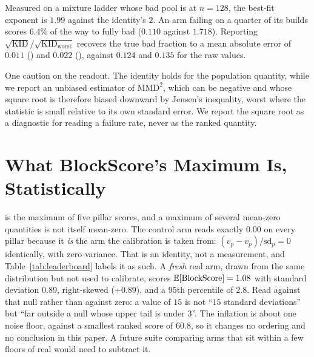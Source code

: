 Measured on a mixture ladder whose bad pool is \randomvox{} at $n{=}128$, the best-fit
exponent is $\mathbf{1.99}$ against the identity's $2$. An arm failing on a quarter of
its builds scores $6.4\%$ of the way to fully bad ($0.110$ against $1.718$). Reporting
$\sqrt{\mathrm{KID}}/\sqrt{\mathrm{KID}_{\text{worst}}}$ recovers the true bad fraction
to a mean absolute error of $\mathbf{0.011}$ (\mvkid{}) and $\mathbf{0.022}$ (\vkid{}),
against $0.124$ and $0.135$ for the raw values.

One caution on the readout. The identity holds for the population quantity, while we
report an unbiased estimator of $\mathrm{MMD}^2$, which can be negative and whose square
root is therefore biased downward by Jensen's inequality, worst where the statistic is
small relative to its own standard error. We report the square root as a diagnostic for
reading a failure rate, never as the ranked quantity.

\section{What BlockScore's Maximum Is, Statistically}
\label{app:blockscore}

\blockscore{} is the maximum of five pillar scores, and a maximum of several
mean-zero quantities is not itself mean-zero. The control arm reads exactly
$0.00$ on every pillar because it \emph{is} the arm the calibration is taken
from: $(v_p - v_p)/\mathrm{sd}_p = 0$ identically, with zero variance. That is
an identity, not a measurement, and Table~\ref{tab:leaderboard} labels it as
such. A \emph{fresh} real arm, drawn from the same distribution but not used to
calibrate, scores $\mathbb{E}[\mbox{BlockScore}] = 1.08$ with standard deviation
$0.89$, right-skewed ($+0.89$), and a $95$th percentile of $2.8$. Read
\blockscore{} against that null rather than against zero: a value of $15$ is not
``$15$ standard deviations'' but ``far outside a null whose upper tail is under
$3$''. The inflation is about one noise floor, against a smallest ranked score
of $60.8$, so it changes no ordering and no conclusion in this paper. A
future suite comparing arms that sit within a few floors of real would need to
subtract it.

